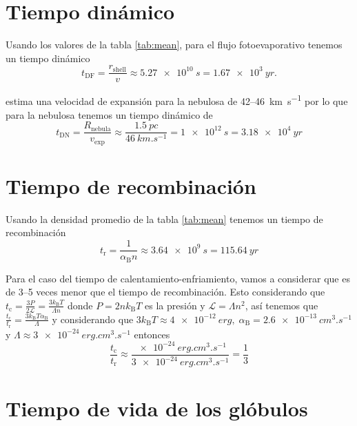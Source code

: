 \documentclass{book}
\begin{document}
\section{Tiempo dinámico}

Usando los valores de la tabla \ref{tab:mean}, para el flujo fotoevaporativo tenemos un tiempo dinámico 
\begin{equation}
t_\mathrm{DF} = \frac{r_\mathrm{shell}}{v} \approx \SI{5.27e10}{s}  = \SI{1.67e3}{yr}.
\end{equation}

\cite{Mancherko:2010} estima una velocidad de expansión para la nebulosa de 42--\SI{46}{km.s^{-1}} por lo que para la nebulosa tenemos un tiempo dinámico de 
\begin{equation}
t_\mathrm{DN}= \frac{R_\mathrm{nebula}}{v_\mathrm{exp}}\approx\frac{\SI{1.5}{pc}}{\SI{46}{km.s^{-1}}}= \SI{1e12}{s}=\SI{3.18e4}{yr}
\end{equation}

\section{Tiempo de recombinación}

Usando la densidad promedio de la tabla \ref{tab:mean} tenemos un tiempo de recombinación 
\begin{equation}
t_\mathrm{r} = \frac{1}{\alpha_\mathrm{B} n} \approx \SI{3.64e9}{s}= \SI{115.64}{yr}
\end{equation}

Para el caso del tiempo de calentamiento-enfriamiento, vamos a considerar que es de 3--5 veces menor que el tiempo de recombinación. Esto considerando que $t_\mathrm{c}=\frac{3P}{2\mathcal{L}}=\frac{3k_\mathrm{B}T}{\Lambda n}$ donde $P=2nk_\mathrm{B}T$ es la presión y $\mathcal{L}=\Lambda n^2$, así tenemos que $\frac{t_\mathrm{c}}{t_\mathrm{r}}=\frac{3k_\mathrm{B}T\alpha_\mathrm{B}}{\Lambda}$ y considerando que $3k_\mathrm{B}T\approx\SI{4e-12}{erg},\; \alpha_\mathrm{B}=\SI{2.6e-13}{cm^3.s^{-1}}$ y $\Lambda\approx\SI{3e-24}{erg.cm^3.s^{-1}}$ entonces
\begin{equation}
    \frac{t_\mathrm{c}}{t_\mathrm{r}}\approx\frac{\SI{e-24}{erg.cm^3.s^{-1}}}{\SI{3e-24}{erg.cm^3.s^{-1}}}=\frac{1}{3}
\end{equation}

\section{Tiempo de vida de los glóbulos}
\end{document}
